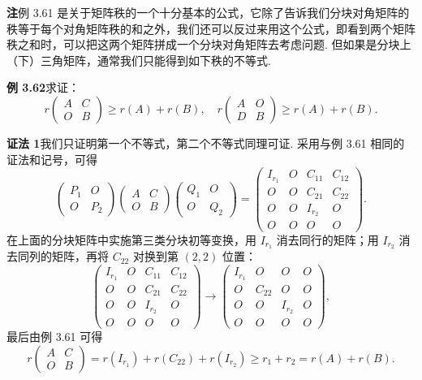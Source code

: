 \documentclass[UTF8,12pt,a4paper,fontset=fandol]{ctexart}
\begin{document}
\noindent\textbf{注}\quad 例 3.61 是关于矩阵秩的一个十分基本的公式，它除了告诉我们分块对角矩阵的秩等于每个对角矩阵秩的和之外，我们还可以反过来用这个公式，即看到两个矩阵秩之和时，可以把这两个矩阵拼成一个分块对角矩阵去考虑问题. 但如果是分块上（下）三角矩阵，通常我们只能得到如下秩的不等式.

\noindent\textbf{例 3.62}\quad 求证：
\[
r\begin{pmatrix}A&C\\O&B\end{pmatrix}\ge r(A)+r(B),\quad
r\begin{pmatrix}A&O\\D&B\end{pmatrix}\ge r(A)+r(B).
\]

\noindent\textbf{证法 1}\quad 我们只证明第一个不等式，第二个不等式同理可证. 采用与例 3.61 相同的证法和记号，可得
\[
\begin{pmatrix}P_1&O\\O&P_2\end{pmatrix}
\begin{pmatrix}A&C\\O&B\end{pmatrix}
\begin{pmatrix}Q_1&O\\O&Q_2\end{pmatrix}
=
\begin{pmatrix}
I_{r_1}&O&C_{11}&C_{12}\\
O&O&C_{21}&C_{22}\\
O&O&I_{r_2}&O\\
O&O&O&O
\end{pmatrix}.
\]
在上面的分块矩阵中实施第三类分块初等变换，用 $I_{r_1}$ 消去同行的矩阵；用 $I_{r_2}$ 消去同列的矩阵，再将 $C_{22}$ 对换到第 $(2,2)$ 位置：
\[
\begin{pmatrix}
I_{r_1}&O&C_{11}&C_{12}\\
O&O&C_{21}&C_{22}\\
O&O&I_{r_2}&O\\
O&O&O&O
\end{pmatrix}
\to
\begin{pmatrix}
I_{r_1}&O&O&O\\
O&C_{22}&O&O\\
O&O&I_{r_2}&O\\
O&O&O&O
\end{pmatrix},
\]
最后由例 3.61 可得
\[
r\begin{pmatrix}A&C\\O&B\end{pmatrix}=r(I_{r_1})+r(C_{22})+r(I_{r_2})\ge r_1+r_2=r(A)+r(B).
\]
\end{document}
